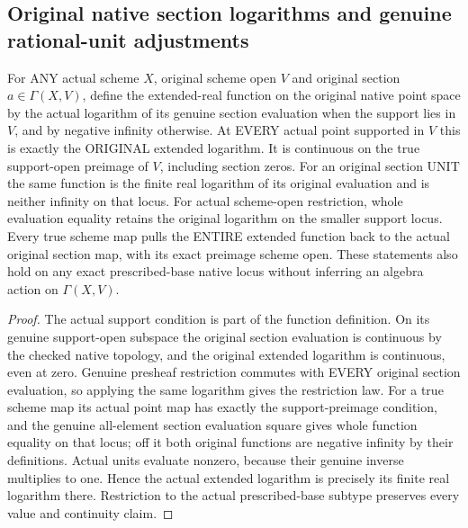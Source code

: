 \subsection{Original native section logarithms and genuine rational-unit adjustments}

\begin{lemma}
\label{scheme:actual-original-native-section-logarithms}
\leanok
{}
For ANY actual scheme $X$, original scheme open $V$ and original section
$a\in\Gamma(X,V)$, define the extended-real function on the original native
point space by the actual logarithm of its genuine section evaluation when
the support lies in $V$, and by negative infinity otherwise. At EVERY actual
point supported in $V$ this is exactly the ORIGINAL extended logarithm.
It is continuous on the true support-open preimage of $V$, including section
zeros. For an original section UNIT the same function is the finite real
logarithm of its original evaluation and is neither infinity on that locus.
For actual scheme-open restriction, whole evaluation equality retains the
original logarithm on the smaller support locus. Every true scheme map
pulls the ENTIRE extended function back to the actual original section map,
with its exact preimage scheme open. These statements also hold on any exact
prescribed-base native locus without inferring an algebra action on $\Gamma(X,V)$.
\end{lemma}
\begin{proof}
The actual support condition is part of the function definition. On its genuine
support-open subspace the original section evaluation is continuous by the
checked native topology, and the original extended logarithm is continuous,
even at zero. Genuine presheaf restriction commutes with EVERY original
section evaluation, so applying the same logarithm gives the restriction law.
For a true scheme map its actual point map has exactly the support-preimage
condition, and the genuine all-element section evaluation square gives
whole function equality on that locus; off it both original functions are
negative infinity by their definitions. Actual units evaluate nonzero,
because their genuine inverse multiplies to one. Hence the actual extended
logarithm is precisely its finite real logarithm there. Restriction to the
actual prescribed-base subtype preserves every value and continuity claim.
\end{proof}

